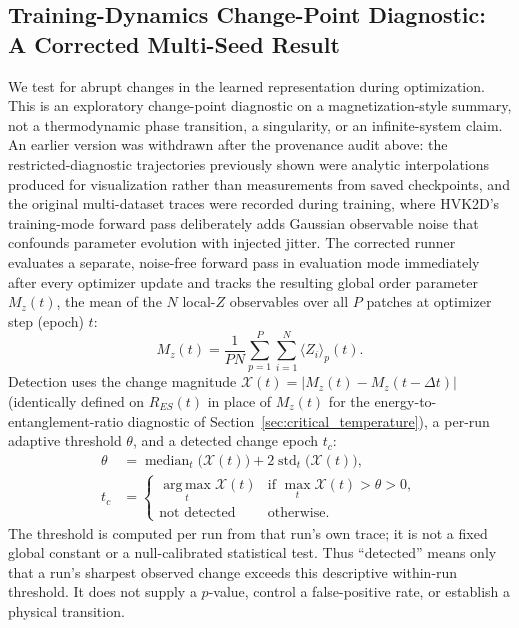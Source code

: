 \documentclass[11pt]{article}
\begin{document}
\subsection{Training-Dynamics Change-Point Diagnostic: A Corrected Multi-Seed Result}
\label{sec:phase_transition_supp}
We test for abrupt changes in the learned representation during optimization. This is an exploratory change-point diagnostic on a magnetization-style summary, not a thermodynamic phase transition, a singularity, or an infinite-system claim. An earlier version was withdrawn after the provenance audit above: the restricted-diagnostic trajectories previously shown were analytic interpolations produced for visualization rather than measurements from saved checkpoints, and the original multi-dataset traces were recorded during training, where HVK2D's training-mode forward pass deliberately adds Gaussian observable noise that confounds parameter evolution with injected jitter. The corrected runner evaluates a separate, noise-free forward pass in evaluation mode immediately after every optimizer update and tracks the resulting global order parameter $M_z(t)$, the mean of the $N$ local-$Z$ observables over all $P$ patches at optimizer step (epoch) $t$:
\begin{equation}
M_z(t) = \frac{1}{P N}\sum_{p=1}^{P}\sum_{i=1}^{N}\langle Z_i\rangle_p(t).
\label{eq:order_parameter}
\end{equation}
Detection uses the change magnitude $\mathcal{X}(t)=|M_z(t)-M_z(t-\Delta t)|$ (identically defined on $R_{ES}(t)$ in place of $M_z(t)$ for the energy-to-entanglement-ratio diagnostic of Section~\ref{sec:critical_temperature}), a per-run adaptive threshold $\theta$, and a detected change epoch $t_c$:
\begin{align}
\theta &= \operatorname{median}_t\big(\mathcal{X}(t)\big) + 2\operatorname{std}_t\big(\mathcal{X}(t)\big), \\
t_c &= \begin{cases}
\displaystyle\operatorname*{arg\,max}_t \mathcal{X}(t) & \text{if } \max_t \mathcal{X}(t) > \theta > 0, \\
\text{not detected} & \text{otherwise.}
\end{cases}
\label{eq:critical_epoch}
\end{align}
The threshold is computed per run from that run's own trace; it is not a fixed global constant or a null-calibrated statistical test. Thus ``detected'' means only that a run's sharpest observed change exceeds this descriptive within-run threshold. It does not supply a $p$-value, control a false-positive rate, or establish a physical transition.
\end{document}
